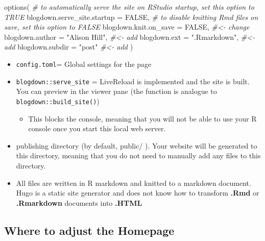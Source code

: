 \documentclass[
]{article}
\newenvironment{Shaded}{\begin{snugshade}}{\end{snugshade}}
\newcommand{\AttributeTok}[1]{\textcolor[rgb]{0.77,0.63,0.00}{#1}}
\newcommand{\CommentTok}[1]{\textcolor[rgb]{0.56,0.35,0.01}{\textit{#1}}}
\newcommand{\ConstantTok}[1]{\textcolor[rgb]{0.00,0.00,0.00}{#1}}
\newcommand{\FunctionTok}[1]{\textcolor[rgb]{0.00,0.00,0.00}{#1}}
\newcommand{\NormalTok}[1]{#1}
\newcommand{\StringTok}[1]{\textcolor[rgb]{0.31,0.60,0.02}{#1}}
\providecommand{\tightlist}{%
  \setlength{\itemsep}{0pt}\setlength{\parskip}{0pt}}
\begin{document}
\begin{Shaded}
\begin{Highlighting}[]

\FunctionTok{options}\NormalTok{(}
  \CommentTok{\# to automatically serve the site on RStudio startup, set this option to TRUE}
  \AttributeTok{blogdown.serve\_site.startup =} \ConstantTok{FALSE}\NormalTok{,}
  \CommentTok{\# to disable knitting Rmd files on save, set this option to FALSE}
  \AttributeTok{blogdown.knit.on\_save =} \ConstantTok{FALSE}\NormalTok{,     }\CommentTok{\#\textless{}{-} change}
  \AttributeTok{blogdown.author =} \StringTok{"Alison Hill"}\NormalTok{,  }\CommentTok{\#\textless{}{-} add}
  \AttributeTok{blogdown.ext =} \StringTok{".Rmarkdown"}\NormalTok{,      }\CommentTok{\#\textless{}{-} add}
  \AttributeTok{blogdown.subdir =} \StringTok{"post"}          \CommentTok{\#\textless{}{-} add}
\NormalTok{)}
\end{Highlighting}
\end{Shaded}

\begin{itemize}
\tightlist
\item
  \texttt{config.toml}= Global settings for the page
\item
  \texttt{blogdown::serve\_site} = LiveReload is implemented and the site is
  built. You can preview in the viewer pane (the function is analogue
  to \texttt{blogdown::build\_site()})

  \begin{itemize}
  \tightlist
  \item
    This blocks the console, meaning that you will not be able to
    use your R console once you start this local web server.
  \end{itemize}
\item
  publishing directory (by default, public/ ). Your website will
  be generated to this directory, meaning that you do not need to
  manually add any files to this directory.
\item
  All files are written in R markdown and knitted to a markdown
  document. Hugo is a static site generator and does not know how to
  transform \textbf{.Rmd} or \textbf{.Rmarkdown} documents into \textbf{.HTML}
\end{itemize}

\hypertarget{where-to-adjust-the-homepage}{%
\subsection{Where to adjust the Homepage}\label{where-to-adjust-the-homepage}}
\end{document}
